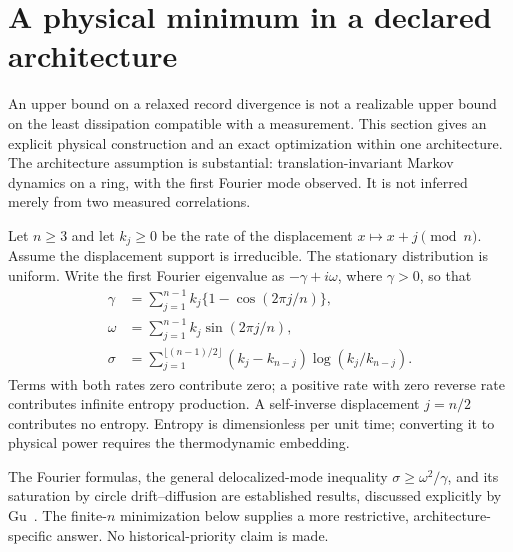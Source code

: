 \section{A physical minimum in a declared architecture}
\label{sec:pa-physical-minimum}

An upper bound on a relaxed record divergence is not a realizable upper bound
on the least dissipation compatible with a measurement. This section gives
an explicit physical construction and an exact optimization within one
architecture. The architecture assumption is substantial: translation-invariant
Markov dynamics on a ring, with the first Fourier mode observed. It is not
inferred merely from two measured correlations.

Let $n\geq3$ and let $k_j\geq0$ be the rate of the displacement
$x\mapsto x+j\pmod n$. Assume the displacement support is irreducible.
The stationary distribution is uniform. Write the first Fourier eigenvalue as
$-\gamma+i\omega$, where $\gamma>0$, so that
\begin{align}
 \gamma&=\sum_{j=1}^{n-1}k_j\{1-\cos(2\pi j/n)\},\\
 \omega&=\sum_{j=1}^{n-1}k_j\sin(2\pi j/n),\\
 \sigma&=\sum_{j=1}^{\lfloor(n-1)/2\rfloor}
       (k_j-k_{n-j})\log(k_j/k_{n-j}).
 \label{eq:pa-circulant-epr}
\end{align}
Terms with both rates zero contribute zero; a positive rate with zero reverse
rate contributes infinite entropy production. A self-inverse displacement
$j=n/2$ contributes no entropy. Entropy is dimensionless per unit time;
converting it to physical power requires the thermodynamic embedding.

The Fourier formulas, the general delocalized-mode inequality
$\sigma\geq\omega^2/\gamma$, and its saturation by circle drift--diffusion
are established results, discussed explicitly by Gu~\cite{rfGu2026}.
The finite-$n$ minimization below supplies a more restrictive, architecture-specific
answer. No historical-priority claim is made.

